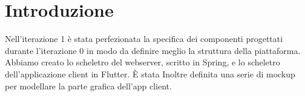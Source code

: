 \section{Introduzione}
Nell’iterazione 1 è stata perfezionata la specifica dei componenti progettati durante l’iterazione 0 in modo da definire meglio la struttura della piattaforma.
Abbiamo creato lo scheletro del webserver, scritto in Spring, e lo scheletro dell'applicazione client in Flutter.
È stata Inoltre definita una serie di mockup per modellare la parte grafica dell'app client.